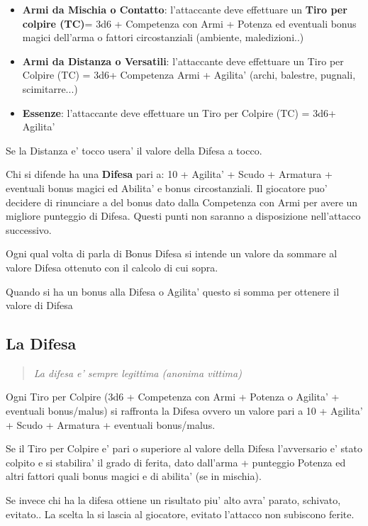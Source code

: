 \documentclass[a4paper,11pt,twoside,openany]{book}
\begin{document}
\begin{itemize}
	\item \textbf{Armi da Mischia o Contatto}: l'attaccante deve effettuare un \textbf{Tiro per colpire (TC)}= 3d6 + Competenza con Armi + Potenza ed eventuali bonus magici dell'arma o fattori circostanziali (ambiente, maledizioni..)
	\item
	\textbf{Armi da Distanza o Versatili}: l'attaccante deve effettuare un Tiro per Colpire (TC) = 3d6+ Competenza Armi + Agilita' (archi, balestre, pugnali, scimitarre...)
	\item	\textbf{Essenze}: l'attaccante deve effettuare un Tiro per Colpire (TC) = 3d6+ Agilita' 
\end{itemize}

Se la Distanza e' tocco usera' il valore della Difesa a tocco.

Chi si difende ha una \textbf{Difesa} pari a: 10 + Agilita' + Scudo + Armatura + eventuali bonus magici ed Abilita' e bonus circostanziali. 
Il giocatore puo' decidere di rinunciare a del bonus dato dalla Competenza con Armi per avere un migliore punteggio di Difesa. Questi punti non saranno a disposizione nell'attacco successivo.

Ogni qual volta di parla di Bonus Difesa si intende un valore da sommare al valore Difesa ottenuto con il calcolo di cui sopra.

Quando si ha un bonus alla Difesa o Agilita' questo si somma per ottenere il valore di Difesa

\subsection{La Difesa}

\label{la-difesa}
\begin{quote}\textit{
		La difesa e' sempre legittima (anonima vittima)
}\end{quote}
Ogni Tiro per Colpire (3d6 + Competenza con Armi + Potenza o Agilita' + eventuali bonus/malus) si raffronta la Difesa ovvero un valore pari a 10 + Agilita' + Scudo + Armatura + eventuali bonus/malus.

Se il Tiro per Colpire e' pari o superiore al valore della Difesa l'avversario e' stato colpito e si stabilira' il grado di ferita, dato dall'arma + punteggio Potenza ed altri fattori quali bonus magici e di abilita' (se in mischia).

Se invece chi ha la difesa ottiene un risultato piu' alto avra' parato, schivato, evitato.. La scelta la si lascia al giocatore, evitato l'attacco non subiscono ferite.
\end{document}
